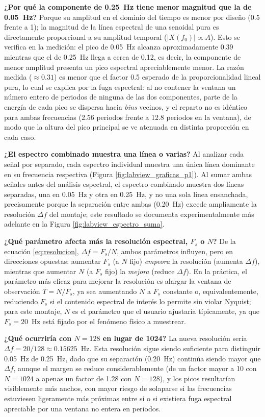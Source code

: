 \documentclass[conference]{IEEEtran}
\begin{document}
\textbf{¿Por qué la componente de 0.25~Hz tiene menor magnitud que la de 0.05~Hz?} Porque su amplitud en el dominio del tiempo es menor por diseño (0.5 frente a 1); la magnitud de la línea espectral de una senoidal pura es directamente proporcional a su amplitud temporal ($|X(f_0)|\propto A$). Esto se verifica en la medición: el pico de 0.05~Hz alcanza aproximadamente 0.39 mientras que el de 0.25~Hz llega a cerca de 0.12, es decir, la componente de menor amplitud presenta un pico espectral apreciablemente menor. La razón medida ($\approx0.31$) es menor que el factor 0.5 esperado de la proporcionalidad lineal pura, lo cual se explica por la fuga espectral: al no contener la ventana un número entero de periodos de ninguna de las dos componentes, parte de la energía de cada pico se dispersa hacia \textit{bins} vecinos, y el reparto no es idéntico para ambas frecuencias (2.56 periodos frente a 12.8 periodos en la ventana), de modo que la altura del pico principal se ve atenuada en distinta proporción en cada caso.

\textbf{¿El espectro combinado muestra una línea o varias?} Al analizar cada señal por separado, cada espectro individual muestra una única línea dominante en su frecuencia respectiva (Figura \ref{fig:labview_graficas_p1}). Al sumar ambas señales antes del análisis espectral, el espectro combinado muestra dos líneas separadas, una en 0.05~Hz y otra en 0.25~Hz, y no una sola línea ensanchada, precisamente porque la separación entre ambas (0.20~Hz) excede ampliamente la resolución $\Delta f$ del montaje; este resultado se documenta experimentalmente más adelante en la Figura \ref{fig:labview_espectro_suma}.

\textbf{¿Qué parámetro afecta más la resolución espectral, $F_s$ o $N$?} De la ecuación \eqref{eq:resolucion}, $\Delta f=F_s/N$, ambos parámetros influyen, pero en direcciones opuestas: aumentar $F_s$ (a $N$ fijo) \textit{empeora} la resolución (aumenta $\Delta f$), mientras que aumentar $N$ (a $F_s$ fijo) la \textit{mejora} (reduce $\Delta f$). En la práctica, el parámetro más eficaz para mejorar la resolución es alargar la ventana de observación $T=N/F_s$, ya sea aumentando $N$ a $F_s$ constante o, equivalentemente, reduciendo $F_s$ si el contenido espectral de interés lo permite sin violar Nyquist; para este montaje, $N$ es el parámetro que el usuario ajustaría típicamente, ya que $F_s=20$~Hz está fijado por el fenómeno físico a muestrear.

\textbf{¿Qué ocurriría con $N=128$ en lugar de 1024?} La nueva resolución sería $\Delta f = 20/128 \approx 0.15625$~Hz. Esta resolución sigue siendo suficiente para distinguir 0.05~Hz de 0.25~Hz, dado que su separación (0.20~Hz) continúa siendo mayor que $\Delta f$, aunque el margen se reduce considerablemente (de un factor mayor a 10 con $N=1024$ a apenas un factor de 1.28 con $N=128$), y los picos resultarían visiblemente más anchos, con mayor riesgo de solaparse si las frecuencias estuviesen ligeramente más próximas entre sí o si existiera fuga espectral apreciable por una ventana no entera en periodos.
\end{document}
